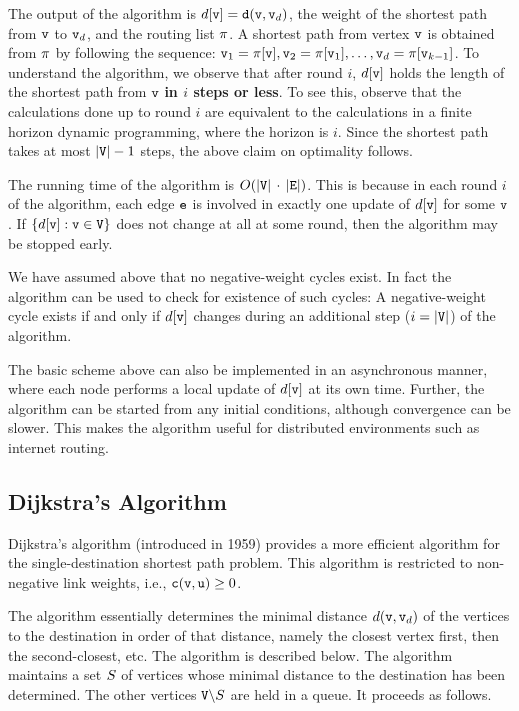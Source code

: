 The output of the algorithm is $d[{\tt v}] = {\tt d}({\tt v},{\tt v}_d)$, the weight of the shortest path from ${\tt v}$ to ${\tt v}_d$, and the routing list $\pi$. A shortest path from vertex ${\tt v}$ is obtained from $\pi $ by following the sequence: ${{\tt v}_1} = \pi [{\tt v}], {{\tt v}_2} = \pi [{{\tt v}_1}],  \ldots ,{\tt v}_d = \pi [{{\tt v}_{k - 1}}]$.
To understand the algorithm, we observe that after round $i$, $d[{\tt v}]$ holds the length of the shortest path from ${\tt v}$ \textbf{in $i$ steps or less}. To see this, observe that the calculations done up to round $i$ are equivalent to the calculations in a finite horizon dynamic programming, where the horizon is $i$. Since the shortest path takes at most $|{\tt V}| - 1$ steps, the above claim on optimality follows.

The running time of the algorithm is $O(|{\tt V}|\, \cdot \,|{\tt E}|)$. This is because in each round $i$ of the algorithm, each edge ${\tt e}$ is involved in exactly one update of $d[{\tt v}]$ for some ${\tt v}$. If $\{ d[{\tt v}]:{\tt v} \in {\tt V}\}$ does not change at all at some round, then the algorithm may be stopped early.

\begin{remark}
    We have assumed above that no negative-weight cycles exist. In fact the algorithm can be used to check for existence of such cycles: A negative-weight cycle exists if and only if  $d[{\tt v}]$ changes during an additional step ($i = |{\tt V}|$) of the algorithm.
\end{remark}
\begin{remark}
    The basic scheme above can also be implemented in an asynchronous manner, where each node performs a local update of $d[{\tt v}]$ at its own time. Further, the algorithm can be started from any initial conditions, although convergence can be slower. This makes the algorithm useful for distributed environments such as internet routing.
\end{remark}

\subsection{Dijkstra's Algorithm}
Dijkstra's algorithm (introduced in 1959) provides a more efficient algorithm for the single-destination shortest path problem. This algorithm is restricted to non-negative link weights, i.e., ${\tt c}({\tt v},{\tt u}) \ge 0$.

The algorithm essentially determines the minimal distance $d({\tt v},{\tt v}_d)$ of the vertices to the destination in order of that distance, namely the closest vertex first, then the second-closest, etc.  The algorithm is 
described below.
The algorithm maintains a set ${S}$ of vertices whose minimal distance to the destination has been determined. The other vertices ${\tt V}\backslash {S}$ are held in a queue. It proceeds as follows.

